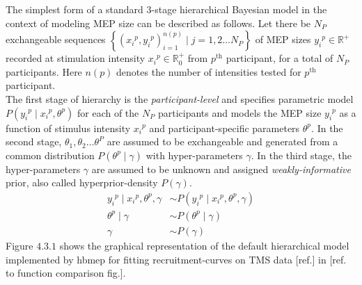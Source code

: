 \documentclass[a4paper,12pt]{article}
\begin{document}
The simplest form of a standard 3-stage hierarchical Bayesian model in the context of modeling MEP size can be described as follows. Let there be $N_P$ exchangeable sequences $\left\{\left({x_i}^p, {y_i}^p\right)_{i=1}^{n(p)} \mid j = 1, 2 \ldots N_P\right\}$ of MEP sizes ${y_i}^p \in \mathbb{R}^+$ recorded at stimulation intensity ${x_i}^p \in \mathbb{R}_0^+$ from $p^{\text{th}}$ participant, for  a total of $N_P$ participants. Here $n(p)$ denotes the number of intensities tested for $p^{\text{th}}$ participant.\\

The first stage of hierarchy is the \textit{participant-level} and specifies parametric model $P\left({y_i}^p \mid {x_i}^p, \theta^p\right)$ for each of the $N_P$ participants and models the MEP size ${y_i}^p$ as a function of stimulus intensity ${x_i}^p$ and participant-specific parameters $\theta^p$. In the second stage, $\theta_1, \theta_2 \ldots \theta^P$ are assumed to be exchangeable and generated from a common distribution $P\left(\theta^p \mid \gamma\right)$ with hyper-parameters $\gamma$. In the third stage, the hyper-parameters $\gamma$ are assumed to be unknown and assigned \textit{weakly-informative} prior, also called hyperprior-density $P\left(\gamma\right)$.
\begin{align*}
{y_i}^p \mid {x_i}^p, \theta^p, \gamma &\sim P\left({y_i}^p \mid {x_i}^p, \theta^p, \gamma\right) \tag{4.3.1} \\
\theta^p \mid \gamma &\sim P\left(\theta^p \mid \gamma\right) \tag{4.3.2} \\
\gamma &\sim P\left(\gamma\right) \tag{4.3.3}
\end{align*}
Figure $4.3.1$ shows the graphical representation of the default hierarchical model implemented by hbmep for fitting recruitment-curves on TMS data [ref.] in [ref. to function comparison fig.].\\
\end{document}
